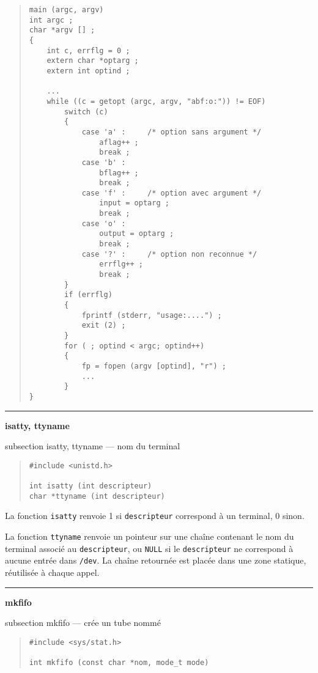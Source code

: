 \documentclass [twoside] {report}
\newcommand {\primitive} [1]
    {
	{\large \bf #1}
	\addcontentsline {toc} {subsection} {#1}
    }
\newcommand {\separation}
    {
	\vspace {7mm}
	\nopagebreak
	\hrule
    }
\begin{document}
\begin {quote}
\begin {verbatim}
main (argc, argv)
int argc ;
char *argv [] ;
{
    int c, errflg = 0 ;
    extern char *optarg ;
    extern int optind ;

    ...
    while ((c = getopt (argc, argv, "abf:o:")) != EOF)
        switch (c)
        {
            case 'a' :     /* option sans argument */
                aflag++ ;
                break ;
            case 'b' :
                bflag++ ;
                break ;
            case 'f' :     /* option avec argument */
                input = optarg ;
                break ;
            case 'o' :
                output = optarg ;
                break ;
            case '?' :     /* option non reconnue */
                errflg++ ;
                break ;
        }
        if (errflg)
        {
            fprintf (stderr, "usage:....") ;
            exit (2) ;
        }
        for ( ; optind < argc; optind++)
        {
            fp = fopen (argv [optind], "r") ;
            ...
        }
}
\end{verbatim}
\end {quote}


\separation 
\primitive {isatty, ttyname} --- nom du terminal

\begin {quote}
\begin {verbatim}
#include <unistd.h>

int isatty (int descripteur)
char *ttyname (int descripteur)
\end{verbatim}
\end {quote}

La fonction {\tt isatty} renvoie 1 si {\tt descripteur} correspond
à un terminal, 0 sinon.

La fonction {\tt ttyname} renvoie un pointeur sur une chaîne contenant
le nom du terminal associé au {\tt descripteur}, ou {\tt NULL} si le
{\tt descripteur} ne correspond à aucune entrée dans {\tt /dev}. La
chaîne retournée est placée dans une zone statique, réutilisée à chaque
appel.



\separation
\primitive {mkfifo} --- crée un tube nommé
    \label {mkfifo}

\begin {quote}
\begin {verbatim}
#include <sys/stat.h>

int mkfifo (const char *nom, mode_t mode)
\end{verbatim}
\end {quote}
\end{document}
